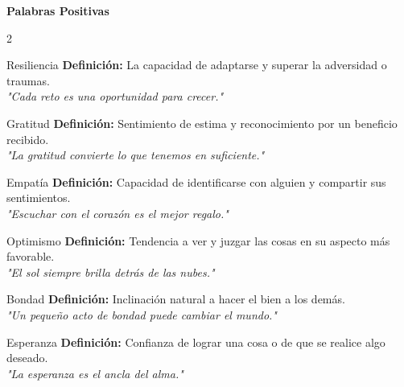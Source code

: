 \documentclass[11pt, a4paper]{article}
\begin{document}
\pagestyle{empty} %

\begin{center}
    \Huge \textbf{Palabras Positivas} \\
    \vspace{1cm}
\end{center}

\begin{multicols}{2}

    \begin{tarjeta}{Resiliencia}
        \textbf{Definición:} La capacidad de adaptarse y superar la adversidad o traumas. \\
        \textit{"Cada reto es una oportunidad para crecer."}
    \end{tarjeta}

    \begin{tarjeta}{Gratitud}
        \textbf{Definición:} Sentimiento de estima y reconocimiento por un beneficio recibido. \\
        \textit{"La gratitud convierte lo que tenemos en suficiente."}
    \end{tarjeta}

    \begin{tarjeta}{Empatía}
        \textbf{Definición:} Capacidad de identificarse con alguien y compartir sus sentimientos. \\
        \textit{"Escuchar con el corazón es el mejor regalo."}
    \end{tarjeta}

    \begin{tarjeta}{Optimismo}
        \textbf{Definición:} Tendencia a ver y juzgar las cosas en su aspecto más favorable. \\
        \textit{"El sol siempre brilla detrás de las nubes."}
    \end{tarjeta}

    \begin{tarjeta}{Bondad}
        \textbf{Definición:} Inclinación natural a hacer el bien a los demás. \\
        \textit{"Un pequeño acto de bondad puede cambiar el mundo."}
    \end{tarjeta}

    \begin{tarjeta}{Esperanza}
        \textbf{Definición:} Confianza de lograr una cosa o de que se realice algo deseado. \\
        \textit{"La esperanza es el ancla del alma."}
    \end{tarjeta}


\end{multicols}
\end{document}

